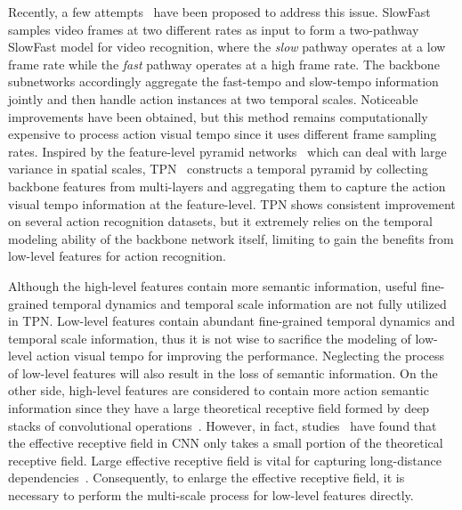 \documentclass[journal]{IEEEtran}
\begin{document}
Recently, a few attempts~\cite{yang2020temporal,zhang2018dynamic,feichtenhofer2019slowfast,yang2020video} have been proposed to address this issue. SlowFast~\cite{feichtenhofer2019slowfast} samples video frames at two different rates as input to form a two-pathway SlowFast model for video recognition, where the \textit{slow} pathway operates at a low frame rate while the \textit{fast} pathway operates at a high frame rate. The backbone subnetworks accordingly aggregate the fast-tempo and slow-tempo information jointly and then handle action instances at two temporal scales. Noticeable improvements have been obtained, but this method remains computationally expensive to process action visual tempo since it uses different frame sampling rates.
Inspired by the feature-level pyramid networks~\cite{t2014Khan,t2018Cholakkal,chen2021person} which can deal with large variance in spatial scales, TPN~\cite{yang2020temporal} constructs a temporal pyramid by collecting backbone features from multi-layers and aggregating them to capture the action visual tempo information at the feature-level. TPN shows consistent improvement on several action recognition datasets, but it extremely relies on the temporal modeling ability of the backbone network itself, limiting to gain the benefits from low-level features for action recognition. 

Although the high-level features contain more semantic information, useful fine-grained temporal dynamics and temporal scale information are not fully utilized in TPN. Low-level features contain abundant fine-grained temporal dynamics and temporal scale information, thus it is not wise to sacrifice the modeling of low-level action visual tempo for improving the performance. Neglecting the process of low-level features will also result in the loss of semantic information. On the other side, high-level features are considered to contain more action semantic information since they have a large theoretical receptive field formed by deep stacks of convolutional operations~\cite{lecun1989backpropagation}. However, in fact, studies~\cite{luo2016understanding} have found that the effective receptive field in CNN only takes a small portion of the theoretical receptive field. Large effective receptive field is vital for capturing long-distance dependencies~\cite{lecun1989backpropagation,NonLocal2018}. Consequently, to enlarge the effective receptive field, it is necessary to perform the multi-scale process for low-level features directly.
\end{document}
